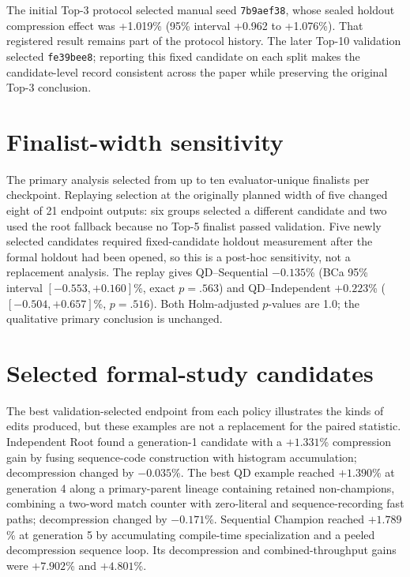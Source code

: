 \documentclass[10pt,twocolumn]{article}
\newcommand{\code}[1]{\texttt{#1}}
\begin{document}
The initial Top-3 protocol selected manual seed \code{7b9aef38}, whose sealed
holdout compression effect was +1.019\% (95\% interval +0.962 to +1.076\%).
That registered result remains part of the protocol history. The later
Top-10 validation selected \code{fe39bee8}; reporting this fixed candidate on
each split makes the candidate-level record consistent across the paper while
preserving the original Top-3 conclusion.

\section{Finalist-width sensitivity}
\label{app:selection-width}

The primary analysis selected from up to ten evaluator-unique finalists per
checkpoint. Replaying selection at the originally planned width of five
changed eight of 21 endpoint outputs: six groups selected a different candidate
and two used the root fallback because no Top-5 finalist passed validation.
Five newly selected candidates required fixed-candidate holdout measurement
after the formal holdout had been opened, so this is a post-hoc sensitivity,
not a replacement analysis. The replay gives QD--Sequential $-0.135$\% (BCa
95\% interval $[-0.553,+0.160]$\%, exact $p=.563$) and QD--Independent
$+0.223$\% ($[-0.504,+0.657]$\%, $p=.516$). Both Holm-adjusted $p$-values are
1.0; the qualitative primary conclusion is unchanged.

\section{Selected formal-study candidates}
\label{app:candidate-examples}

The best validation-selected endpoint from each policy illustrates the kinds
of edits produced, but these examples are not a replacement for the paired
statistic. Independent Root found a generation-1 candidate with a $+1.331$\%
compression gain by fusing sequence-code construction with histogram
accumulation; decompression changed by $-0.035$\%. The best QD example reached
$+1.390$\% at generation 4 along a primary-parent lineage
containing retained non-champions, combining a two-word match counter with
zero-literal and sequence-recording fast paths; decompression changed by
$-0.171$\%. Sequential Champion reached $+1.789$\% at generation 5
by accumulating compile-time specialization and a peeled decompression
sequence loop. Its decompression and combined-throughput gains were
$+7.902$\% and $+4.801$\%.
\end{document}
